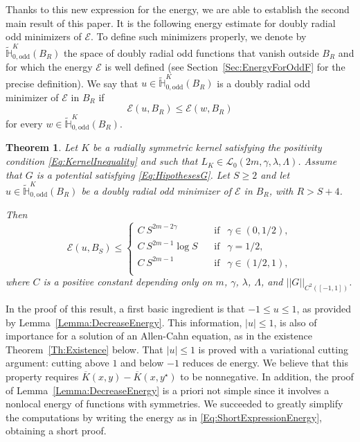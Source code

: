 \documentclass[12pt,reqno]{amsart}
\newtheorem{theorem}{Theorem}[section]
\theoremstyle{definition}
\theoremstyle{remark}
\newcommand{\con}[1]{\mathbb{#1}}
\renewcommand{\H}{\con{H}}
\newcommand{\ecal}{\mathcal{E}}
\newcommand{\lcal}{\mathcal{L}}
\newcommand{\norm}[1]{\left | \left |{#1} \right | \right |}
\newcommand{\s}{\gamma}
\numberwithin{equation}{section}
\begin{document}
Thanks to this new expression for the energy, we are able to establish the second main result of this paper. It is the following energy estimate for doubly radial odd minimizers of $\ecal$. To define such minimizers properly, we denote by $\widetilde{\H}^K_{0, \mathrm{odd}}(B_R)$ the space of doubly radial odd functions that vanish outside $B_R$ and for which the energy $\ecal$ is well defined (see Section~\ref{Sec:EnergyForOddF} for the precise definition). We say that $u\in \widetilde{\H}^K_{0, \mathrm{odd}}(B_R)$ is a doubly radial odd minimizer of $\ecal$ in $B_R$ if
$$
\ecal(u,B_R) \leq \ecal (w,B_R)
$$
for every $w\in \widetilde{\H}^K_{0, \mathrm{odd}}(B_R)$. 

\begin{theorem}
	\label{Th:EnergyEstimate} 
	Let $K$ be a radially symmetric kernel satisfying the positivity condition \eqref{Eq:KernelInequality} and such that $L_K\in \lcal_0(2m, \s, \lambda, \Lambda)$. Assume that $G$ is a potential satisfying \eqref{Eq:HipothesesG}. Let $S\geq2$ and let $u\in \widetilde{\H}^K_{0, \mathrm{odd}}(B_R)$ be a doubly radial odd minimizer of $\ecal$ in $B_R$, with $R>S+4$. 
	
	Then
	\begin{equation}
	\label{Eq:EnergyEstimate} 
	\ecal (u,B_S) \leq 
	\begin{cases}
	C \ S^{2m-2\s}\ \ \ \ &\textrm{if } \ \ \s\in(0,1/2),\\
	C \ S^{2m-1} \log S\ \ \ \ &\textrm{if } \ \ \s=1/2,\\
	C \ S^{2m-1}\ \ \ \ &\textrm{if } \ \ \s\in(1/2,1),\\
	\end{cases}
	\end{equation}
	where $C$ is a positive constant depending only on $m$, $\s$, $\lambda$, $\Lambda$, and $\norm{G}_{C^2([-1,1])}$.
\end{theorem}


In the proof of this result, a first basic ingredient is that $-1\leq u\leq 1$, as provided by Lemma~\ref{Lemma:DecreaseEnergy}. This information, $|u|\leq 1$, is also of importance for a solution of an Allen-Cahn equation, as in the existence Theorem~\ref{Th:Existence} below. That $|u|\leq 1$ is proved with a variational cutting argument: cutting above $1$ and below $-1$ reduces de energy. We believe that this property requires $\overline{K}(x,y)- \overline{K}(x,y^\star)$ to be nonnegative. In addition, the proof of Lemma~\ref{Lemma:DecreaseEnergy} is a priori not simple since it involves a nonlocal energy of functions with symmetries. We succeeded to greatly simplify the computations by writing the energy as in \eqref{Eq:ShortExpressionEnergy}, obtaining a short proof.
\end{document}
